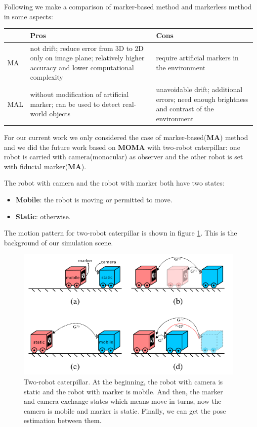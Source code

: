 Following we make a comparison of marker-based method and markerless method in some aspects: 
\begin{center}
   \begin{tabular}{ | l | p{5cm} | p{5cm} |}
    \hline
      & Pros & Cons\\ \hline 
    MA & not drift; reduce error from 3D to 2D only on image plane; relatively higher accuracy and lower computational complexity & require artificial markers in the environment \\ \hline
    MAL & without modification of artificial marker; can be used to detect real-world objects  & unavoidable drift; additional errors; need enough brightness and contrast of the environment   \\ \hline
    \end{tabular}
\end{center}


For our current work we only considered the case of marker-based(\textbf{MA}) method and we did the future work based on \textbf{MOMA} with two-robot caterpillar: one robot is carried with camera(monocular) as observer and the other robot is set with fiducial marker(\textbf{MA}).

The robot with camera and the robot with marker both have two states:

\begin{itemize}
\item \textbf{Mobile}: the robot is moving or permitted to move.
\item \textbf{Static}: otherwise.
\end{itemize}

The motion pattern for two-robot caterpillar is shown in figure \ref{fig:moma}. This is the background of our simulation scene.

\begin{figure}[h]
\centering
\includegraphics[scale=0.5]{./fig/moma.png}
\caption{Two-robot caterpillar. At the beginning, the robot with camera is static and the robot with marker is mobile. And then, the marker and camera exchange states which means move in turns, now the camera is mobile and marker is static. Finally, we can get the pose estimation between them\cite{acuna2017moma}.}
\label{fig:moma}
\end{figure}
